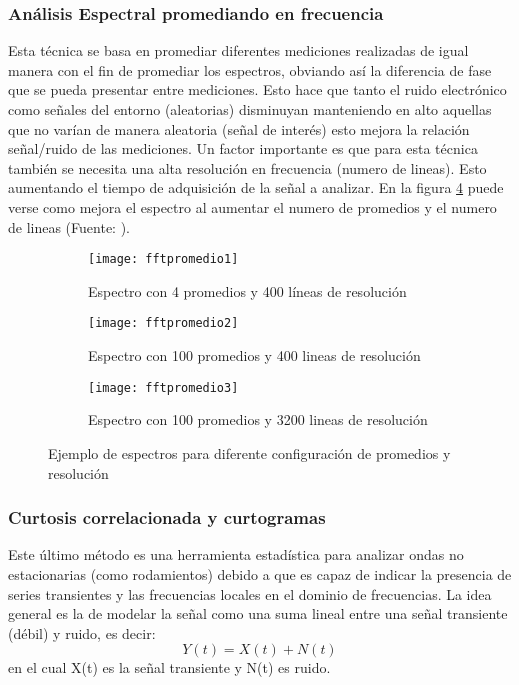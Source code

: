 			     \subsubsection{Análisis Espectral promediando en frecuencia}
			        Esta técnica se basa en promediar diferentes mediciones realizadas de igual manera con el fin de promediar los espectros, obviando así la diferencia de fase que se pueda presentar entre mediciones. Esto hace que tanto el ruido electrónico como señales del entorno (aleatorias) disminuyan manteniendo en alto aquellas que no varían de manera aleatoria (señal de interés) esto mejora la relación señal/ruido de las mediciones. Un factor importante es que para esta técnica también se necesita una alta resolución en frecuencia (numero de lineas). Esto aumentando el tiempo de adquisición de la señal a analizar.
			        En la figura \ref{fig:fftpromedio} puede verse como mejora el espectro al aumentar el numero de promedios y el numero de lineas (Fuente: \cite{pedrosaav}).
        			\begin{figure}[H]
        				\centering
        				\begin{subfigure}[b]{\linewidth}
        				    \centering
        					\texttt{[image: fftpromedio1]}
        					\caption{Espectro con 4 promedios y 400 líneas de resolución}
        					\label{fig:fftpromedio1}
        				\end{subfigure}
        				\begin{subfigure}[b]{\linewidth}
        				    \centering
        					\texttt{[image: fftpromedio2]}
        					\caption{Espectro con 100 promedios y 400 lineas de resolución}
        					\label{fig:fftpromedio2}
        				\end{subfigure}
        				\begin{subfigure}[b]{\linewidth}
        				    \centering
        					\texttt{[image: fftpromedio3]}
        					\caption{Espectro con 100 promedios y 3200 lineas de resolución}
        					\label{fig:fftpromedio3}
        				\end{subfigure}
        				\caption{Ejemplo de espectros para diferente configuración de promedios y resolución}
        				\label{fig:fftpromedio}
        			\end{figure}	
        		\subsubsection{Curtosis correlacionada y curtogramas}
        		    Este último método es una herramienta estadística para analizar ondas no estacionarias (como rodamientos) debido a que es capaz de indicar la presencia de series transientes y las frecuencias locales en el dominio de frecuencias. La idea general es la de modelar la señal como una suma lineal entre una señal transiente (débil) y ruido, es decir:
        		    \begin{equation}  		         		        
        		        Y(t)=X(t)+N(t)
        		    \end{equation}
        		    en el cual X(t) es la señal transiente y N(t) es ruido. 
        		    
